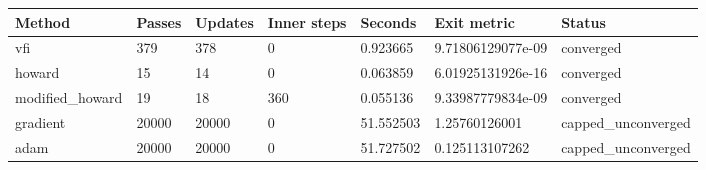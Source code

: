 \begin{tabular}{lllllll}
\hline
Method & Passes & Updates & Inner steps & Seconds & Exit metric & Status \\
\hline
vfi & 379 & 378 & 0 & 0.923665 & 9.71806129077e-09 & converged \\
howard & 15 & 14 & 0 & 0.063859 & 6.01925131926e-16 & converged \\
modified\_howard & 19 & 18 & 360 & 0.055136 & 9.33987779834e-09 & converged \\
gradient & 20000 & 20000 & 0 & 51.552503 & 1.25760126001 & capped\_unconverged \\
adam & 20000 & 20000 & 0 & 51.727502 & 0.125113107262 & capped\_unconverged \\
\hline
\end{tabular}
